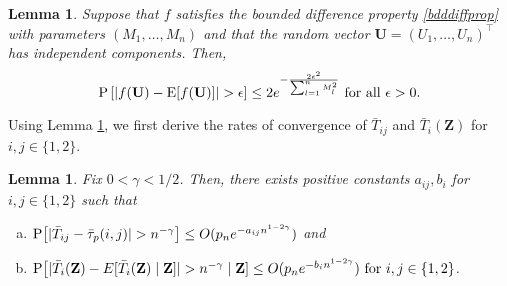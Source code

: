 \documentclass[twoside]{article}
\newcommand{\bZ}{\mathbf{Z}}
\newcommand{\bU}{\mathbf{U}}
\newcommand{\0}{\mathbf{0}}
\newcommand{\1}{\mathbf{1}}
\numberwithin{equation}{section}
\newtheorem{lemma}[thm]{Lemma}
\begin{document}
\begin{lemma}\label{bdddiffineq}
\citep[page 37]{wainwright2019high} Suppose that $f$ satisfies the bounded difference property \eqref{bdddiffprop} with parameters $(M_1,\ldots, M_n)$ and that the random vector $\bU = (U_1,\ldots, U_n)^\top$ has independent components. Then,
$${\rm P}\left[\left|f(\bU)-{\rm E}[f(\bU)]\right|>\epsilon\right ]\leq 2e^{-\frac{2\epsilon^2}{\sum_{l=1}^nM_l^2}}\text{ for all }\epsilon>0.$$
\end{lemma}

Using Lemma \ref{bdddiffineq}, we first derive the rates of convergence of $\bar{T}_{ij}$ and $\bar{T}_i(\bZ)$ for $i,j\in\{1,2\}$.
\begin{lemma}\label{supplemm2}
Fix $0<\gamma<1/2$. Then, there exists positive constants $a_{ij},b_{i}$ for $i,j\in\{1,2\}$ such that
\begin{enumerate}[(a)]
 \item ${\rm P}\big [|\bar{T}_{ij}-\bar{\tau}_p(i,j)|>n^{-\gamma} \big]\leq O(p_n e^{-a_{ij} n^{1-2\gamma}})$ and
 \item ${\rm P}\big [|\bar{T}_{i}(\bZ)-E[\bar{T}_{i}(\bZ)\mid \bZ]|>n^{-\gamma} \mid \bZ]\leq O(p_n e^{-b_{i} n^{1-2\gamma}})\text{ for }i,j\in\{1,2\}$.
\end{enumerate}
\end{lemma}
\end{document}
